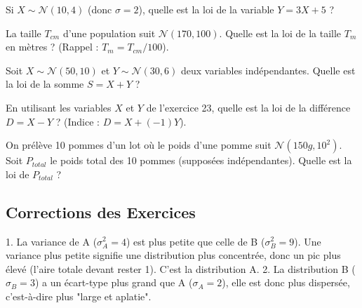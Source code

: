 
\begin{exercicebox}
Si $X \sim \mathcal{N}(10, 4)$ (donc $\sigma=2$), quelle est la loi de la variable $Y = 3X + 5$ ?
\end{exercicebox}

\begin{exercicebox}
La taille $T_{cm}$ d'une population suit $\mathcal{N}(170, 100)$. Quelle est la loi de la taille $T_{m}$ en mètres ? (Rappel : $T_{m} = T_{cm} / 100$).
\end{exercicebox}

\begin{exercicebox}
Soit $X \sim \mathcal{N}(50, 10)$ et $Y \sim \mathcal{N}(30, 6)$ deux variables indépendantes.
Quelle est la loi de la somme $S = X + Y$ ?
\end{exercicebox}

\begin{exercicebox}
En utilisant les variables $X$ et $Y$ de l'exercice 23, quelle est la loi de la différence $D = X - Y$ ?
(Indice : $D = X + (-1)Y$).
\end{exercicebox}

\begin{exercicebox}
On prélève 10 pommes d'un lot où le poids d'une pomme suit $\mathcal{N}(150g, 10^2)$. Soit $P_{total}$ le poids total des 10 pommes (supposées indépendantes).
Quelle est la loi de $P_{total}$ ?
\end{exercicebox}

\subsection{Corrections des Exercices}

\begin{correctionbox}
1.  La variance de A ($\sigma_A^2=4$) est plus petite que celle de B ($\sigma_B^2=9$). Une variance plus petite signifie une distribution plus concentrée, donc un pic plus élevé (l'aire totale devant rester 1). C'est la distribution A.
2.  La distribution B ($\sigma_B=3$) a un écart-type plus grand que A ($\sigma_A=2$), elle est donc plus dispersée, c'est-à-dire plus "large et aplatie".
\end{correctionbox}

